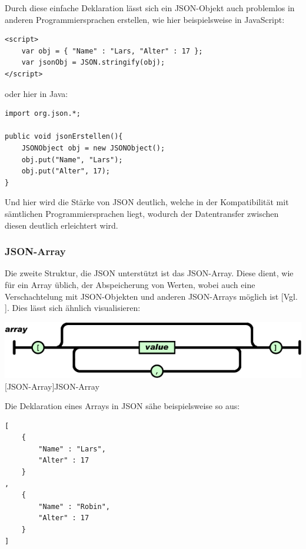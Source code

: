 \documentclass[12pt,a4paper,bibliography=totocnumbered,listof=totocnumbered]{scrartcl}
\begin{document}
Durch diese einfache Deklaration lässt sich ein JSON-Objekt auch problemlos in anderen Programmiersprachen erstellen, wie hier beispielsweise in JavaScript:
\\
\vspace{1em}
\begin{lstlisting}[caption=JSON-Objekt in JavaScript, label=lst:json-objekt1]
<script>
	var obj = { "Name" : "Lars, "Alter" : 17 };
	var jsonObj = JSON.stringify(obj);
</script>
\end{lstlisting}

oder hier in Java:
\\
\vspace{1em}
\begin{lstlisting}[caption=JSON-Objekt in Java, label=lst:json-objekt2]
import org.json.*;

public void jsonErstellen(){
	JSONObject obj = new JSONObject();
	obj.put("Name", "Lars");
	obj.put("Alter", 17);
}
\end{lstlisting}

Und hier wird die Stärke von JSON deutlich, welche in der Kompatibilität mit sämtlichen Programmiersprachen liegt, wodurch der Datentransfer zwischen diesen deutlich erleichtert wird.

\subsubsection{JSON-Array}
\label{sec:JSON-Array}
Die zweite Struktur, die JSON unterstützt ist das JSON-Array.
Diese dient, wie für ein Array üblich, der Abspeicherung von Werten, wobei auch eine Verschachtelung mit JSON-Objekten und anderen JSON-Arrays möglich ist [Vgl. \cite{json}].
Dies lässt sich ähnlich visualisieren:

\vspace{1em}
\begin{minipage}{\linewidth}
	\centering
	\includegraphics[width=0.9\linewidth]{Bilder/json-array.png}
	[JSON-Array]{JSON-Array\footnotemark }
	\label{fig:json-array}
\end{minipage}

Die Deklaration eines Arrays in JSON sähe beispielsweise so aus:
\\
\vspace{1em}
\begin{lstlisting}[caption=Klasse.json, label=lst:json-array]
[
	{
		"Name" : "Lars",
		"Alter" : 17
	}
,
	{
 		"Name" : "Robin",
 		"Alter" : 17
	}
]
\end{lstlisting}
\end{document}
